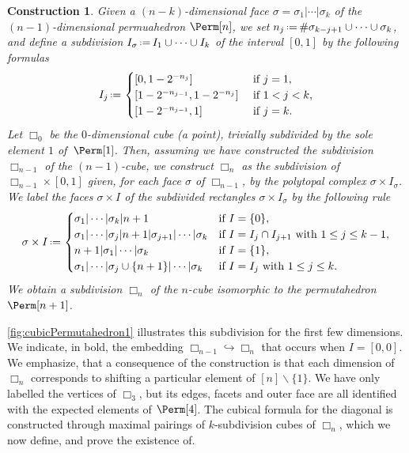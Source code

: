 \documentclass{amsart}
\newtheorem{construction}[theorem]{Construction}
\theoremstyle{definition}
\newcommand{\ssm}{\smallsetminus} %
\newcommand{\eqdef}{\mbox{\,\raisebox{0.2ex}{\scriptsize\ensuremath{\mathrm:}}\ensuremath{=}\,}} %
\newcommand{\card}[1]{\##1} %
\newcommand{\divcube}[1]{\Box_{#1}}
\begin{document}
\begin{construction}
\label{constr:cubicPermutahedron1}
Given a $(n-k)$-dimensional face $\sigma = \sigma_1| \cdots |\sigma_k$ of the $(n-1)$-dimensional permuahedron $\Perm[n]$, we set $n_j \eqdef \card{\sigma_{k-j+1}\cup\dots\cup \sigma_k}$, and define a subdivision $I_\sigma \eqdef I_1 \cup \dots \cup I_k$ of the interval $[0,1]$ by the following formulas
\begin{equation*}
	I_j \eqdef
	\begin{cases}
		\left[0,1 - 2^{-n_j}\right] & \text{ if } j=1, \\
		\left[1 - 2^{-n_{j-1}}, 1 - 2^{-n_{j}}\right]  & \text{ if } 1 < j < k, \\
		\left[1 - 2^{-n_{j-1}},1\right] & \text{ if } j=k .
	\end{cases}
\end{equation*}
Let $\divcube{0}$ be the $0$-dimensional cube (a point), trivially subdivided by the sole element $1$ of~$\Perm[1]$.
Then, assuming we have constructed the subdivision $\divcube{n-1}$ of the $(n-1)$-cube, we construct $\divcube{n}$ as the subdivision of $\divcube{n-1} \times [0,1]$ given, for each face $\sigma$ of $\divcube{n-1}$, by the polytopal complex $\sigma \times I_\sigma$. 
We label the faces $\sigma \times I$ of the subdivided rectangles $\sigma \times I_\sigma$ by the following rule
\begin{align} \label{eq:SU cube inductive def}
	\sigma \times I \eqdef
	\begin{cases}
		\sigma_1| \cdots |\sigma_k| n+1 & \text{if } I = \{0\}, \\
		\sigma_1| \cdots |\sigma_j| n+1 |\sigma_{j+1}| \cdots |\sigma_k & \text{if } I = I_j \cap I_{j+1} \text{ with } 1 \leq j \leq k-1 , \\
		n+1|\sigma_1| \cdots |\sigma_k  & \text{if } I = \{1\}, \\
		\sigma_1| \cdots |\sigma_j \cup \{n+1\}| \cdots |\sigma_k & \text{if } I = I_j \text{ with }  1\leq j \leq k.
	\end{cases}
\end{align}
We obtain a subdivision $\divcube{n}$ of the $n$-cube isomorphic to the permutahedron $\Perm[n+1]$.
\end{construction}

\cref{fig:cubicPermutahedron1} illustrates this subdivision for the first few dimensions.
We indicate, in bold, the embedding $\divcube{n-1}\hookrightarrow \divcube{n}$ that occurs when $I=[0, 0]$. 
We emphasize, that a consequence of the construction is that each dimension of $\divcube{n}$ corresponds to shifting a particular element of $[n]\ssm \{1\}$.
We have only labelled the vertices of $\divcube{3}$, but its edges, facets and outer face are all identified with the expected elements of $\Perm[4]$.
The cubical formula for the diagonal is constructed through maximal pairings of $k$-subdivision cubes of $\divcube{n}$, which we now define, and prove the existence of.
\end{document}
